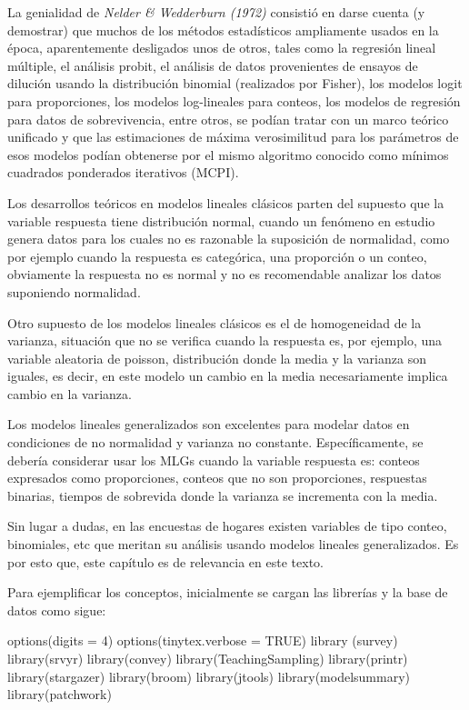 \documentclass[
  12pt,
]{book}
\newenvironment{Shaded}{\begin{snugshade}}{\end{snugshade}}
\newcommand{\AttributeTok}[1]{\textcolor[rgb]{0.77,0.63,0.00}{#1}}
\newcommand{\ConstantTok}[1]{\textcolor[rgb]{0.00,0.00,0.00}{#1}}
\newcommand{\DecValTok}[1]{\textcolor[rgb]{0.00,0.00,0.81}{#1}}
\newcommand{\FunctionTok}[1]{\textcolor[rgb]{0.00,0.00,0.00}{#1}}
\newcommand{\NormalTok}[1]{#1}
\begin{document}
La genialidad de \emph{Nelder \& Wedderburn (1972)} consistió en darse cuenta (y demostrar) que muchos de los métodos estadísticos ampliamente usados en la época, aparentemente desligados unos de otros, tales como la regresión lineal múltiple, el análisis probit, el análisis de datos provenientes de ensayos de dilución usando la distribución binomial (realizados por Fisher), los modelos logit para proporciones, los modelos log-lineales para conteos, los modelos de regresión para datos de sobrevivencia, entre otros, se podían tratar con un marco teórico unificado y que las estimaciones de máxima verosimilitud para los parámetros de esos modelos podían obtenerse por el mismo algoritmo conocido como mínimos cuadrados ponderados iterativos (MCPI).

Los desarrollos teóricos en modelos lineales clásicos parten del supuesto que la variable respuesta tiene distribución normal, cuando un fenómeno en estudio genera datos para los cuales no es razonable la suposición de normalidad, como por ejemplo cuando la respuesta es categórica, una proporción o un conteo, obviamente la respuesta no es normal y no es recomendable analizar los datos suponiendo normalidad.

Otro supuesto de los modelos lineales clásicos es el de homogeneidad de la varianza, situación que no se verifica cuando la respuesta
es, por ejemplo, una variable aleatoria de poisson, distribución donde la media y la varianza son iguales, es decir, en este modelo un cambio en la media necesariamente implica cambio en la varianza.

Los modelos lineales generalizados son excelentes para modelar datos en condiciones de no normalidad y varianza no constante. Específicamente, se debería considerar usar los MLGs cuando la variable respuesta es: conteos expresados como proporciones, conteos que no son proporciones, respuestas binarias, tiempos de sobrevida donde la varianza se incrementa con la media.

Sin lugar a dudas, en las encuestas de hogares existen variables de tipo conteo, binomiales, etc que meritan su análisis usando modelos lineales generalizados. Es por esto que, este capítulo es de relevancia en este texto.

Para ejemplificar los conceptos, inicialmente se cargan las librerías y la base de datos como sigue:

\begin{Shaded}
\begin{Highlighting}[]
\FunctionTok{options}\NormalTok{(}\AttributeTok{digits =} \DecValTok{4}\NormalTok{)}
\FunctionTok{options}\NormalTok{(}\AttributeTok{tinytex.verbose =} \ConstantTok{TRUE}\NormalTok{)}
\FunctionTok{library}\NormalTok{ (survey)}
\FunctionTok{library}\NormalTok{(srvyr)}
\FunctionTok{library}\NormalTok{(convey)}
\FunctionTok{library}\NormalTok{(TeachingSampling)}
\FunctionTok{library}\NormalTok{(printr)}
\FunctionTok{library}\NormalTok{(stargazer)}
\FunctionTok{library}\NormalTok{(broom)}
\FunctionTok{library}\NormalTok{(jtools)}
\FunctionTok{library}\NormalTok{(modelsummary)}
\FunctionTok{library}\NormalTok{(patchwork)}
\end{Highlighting}
\end{Shaded}
\end{document}

